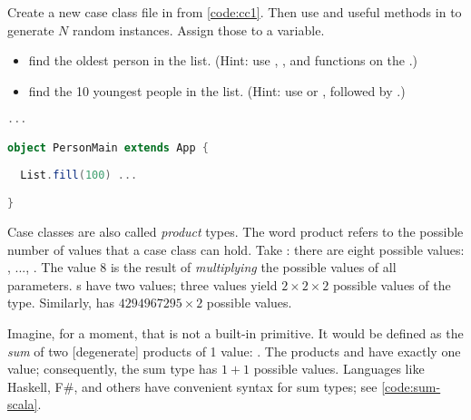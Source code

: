 \documentclass[10 pt]{article}
\begin{document}
\begin{example}
Create a new case class  file in  from \autoref{code:cc1}. Then use  and useful methods in  to generate $N$ random  instances. Assign those to a variable.
\begin{itemize}
  \item find the oldest person in the list. (Hint: use , , and  functions on the .)
  \item find the 10 youngest people in the list. (Hint: use  or , followed by .)
\end{itemize}

\begin{lstlisting}[caption={Pattern matching}, label={code:pmex}, language=Scala, escapechar=|]
...

object PersonMain extends App {
  
  List.fill(100) ...  

}
\end{lstlisting}
\end{example}

Case classes are also called \emph{product} types. The word product refers to the possible number of values that a case class can hold. Take : there are eight possible values: , ..., . The value $8$ is the result of \emph{multiplying} the possible values of all parameters. s have two values; three  values yield $2 \times 2 \times 2$ possible values of the  type. Similarly,  has $4294967295 \times 2$ possible values. 

Imagine, for a moment, that  is not a built-in primitive. It would be defined as the \emph{sum} of two [degenerate] products of 1 value: . The products  and  have exactly one value; consequently, the sum type  has $1 + 1$ possible values. Languages like Haskell\cite{haskell}, F\#\cite{fsharp}, and others have convenient syntax for sum types; see \autoref{code:sum-scala}.
\end{document}
